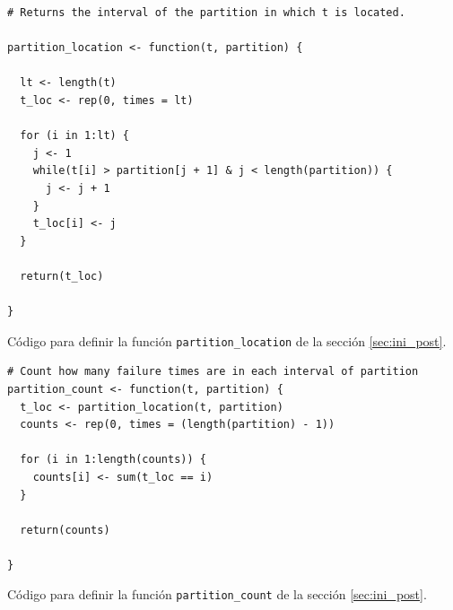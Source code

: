 \documentclass[11pt,a4paper]{article}
\begin{document}
\begin{appendices}
\begin{table}[!htb]
\begin{lstlisting}
# Returns the interval of the partition in which t is located.

partition_location <- function(t, partition) {

  lt <- length(t)
  t_loc <- rep(0, times = lt)

  for (i in 1:lt) {
    j <- 1
    while(t[i] > partition[j + 1] & j < length(partition)) {
      j <- j + 1
    }
    t_loc[i] <- j
  }

  return(t_loc)

}
\end{lstlisting}
\caption{Código para definir la función \texttt{partition\_location} de la sección \ref{sec:ini_post}.}
\end{table}

\begin{table}[!htb]
\begin{lstlisting}
# Count how many failure times are in each interval of partition
partition_count <- function(t, partition) {
  t_loc <- partition_location(t, partition)
  counts <- rep(0, times = (length(partition) - 1))

  for (i in 1:length(counts)) {
    counts[i] <- sum(t_loc == i)
  }

  return(counts)

}
\end{lstlisting}
\caption{Código para definir la función \texttt{partition\_count} de la sección \ref{sec:ini_post}.}
\end{table}

\end{appendices}

\clearpage
\newpage


\end{document}
